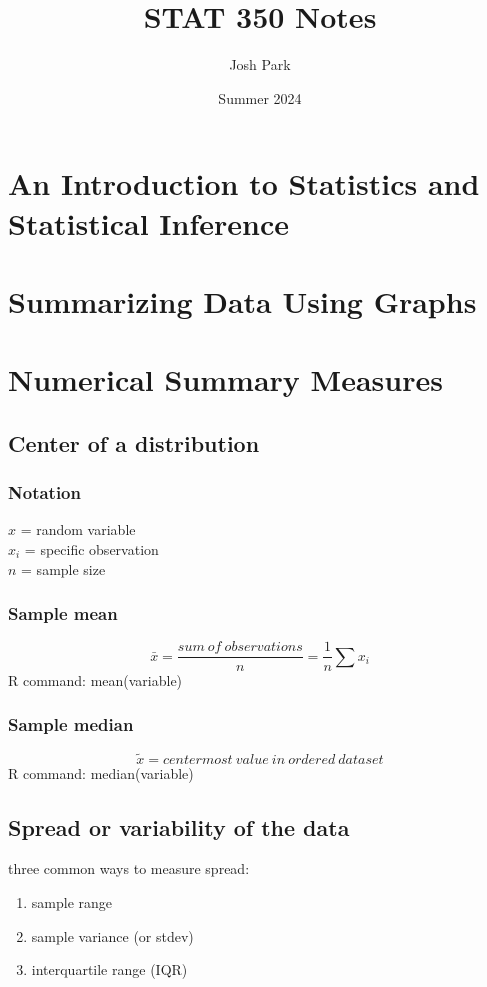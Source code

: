 \documentclass{report}
\title{STAT 350 Notes}
\author{Josh Park}
\date{Summer 2024}
\begin{document}
\maketitle
\chapter{An Introduction to Statistics and Statistical Inference}  %

\chapter{Summarizing Data Using Graphs}  %

\chapter{Numerical Summary Measures}  %

    \section{Center of a distribution}
        \subsection{Notation}
        $x$ = random variable\\
        $x_i$ = specific observation\\
        $n$ = sample size

        \subsection{Sample mean}
        \begin{equation}\bar{x}=\frac{sum\ of\ observations}{n}=\frac{1}{n}\sum x_i\end{equation}
        R command: mean(variable)

        \subsection{Sample median} 
        \begin{equation}\tilde{x}= centermost\ value\ in\ ordered\ dataset\end{equation}
        R command: median(variable)

    \section{Spread or variability of the data}
    three common ways to measure spread:
    \begin{enumerate}
        \item sample range
        \item sample variance (or stdev)
        \item interquartile range (IQR)
    \end{enumerate}
\end{document}
